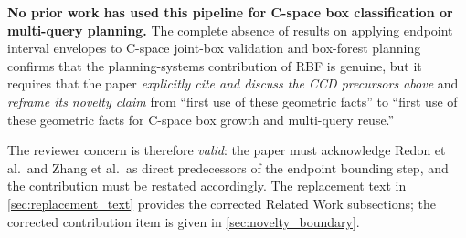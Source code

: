 \documentclass[11pt,a4paper]{article}
\begin{document}
\textbf{No prior work has used this pipeline for C-space box classification
or multi-query planning.}  The complete absence of results on applying
endpoint interval envelopes to C-space joint-box validation and box-forest
planning confirms that the planning-systems contribution of RBF is genuine,
but it requires that the paper \emph{explicitly cite and discuss the CCD
precursors above} and \emph{reframe its novelty claim} from ``first use of
these geometric facts'' to ``first use of these geometric facts for
C-space box growth and multi-query reuse.''

The reviewer concern is therefore \emph{valid}: the paper must acknowledge
Redon et al.\ and Zhang et al.\ as direct predecessors of the endpoint
bounding step, and the contribution must be restated accordingly.
The replacement text in \cref{sec:replacement_text} provides the corrected
Related Work subsections; the corrected contribution item is given in
\cref{sec:novelty_boundary}.


\end{document}

